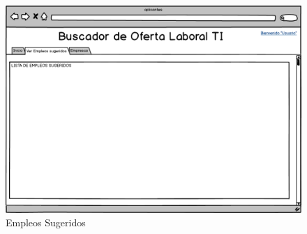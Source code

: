 \begin{figure}[h]
\begin{center}
	\includegraphics[scale=0.55]{./resources/08sugeridos.png}
	\caption{Empleos Sugeridos}
	\label{fig:exito}
\end{center}
\end{figure}

